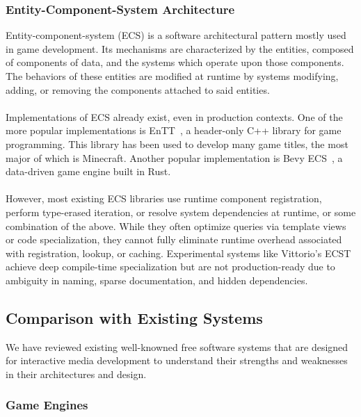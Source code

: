 \subsubsection*{Entity-Component-System Architecture}

Entity-component-system (ECS) is a software architectural pattern mostly used in game development.
Its mechanisms are characterized by the entities, composed of components of data,
and the systems which operate upon those components.
The behaviors of these entities are modified at runtime by systems modifying, adding, or removing the components
attached to said entities.
\\\\
Implementations of ECS already exist, even in production contexts.
One of the more popular implementations is EnTT~\cite{ValtoLibraries_EnTT}, a header-only C++ library for game programming.
This library has been used to develop many game titles, the most major of which is Minecraft.
Another popular implementation is Bevy ECS~\cite{Bevy_Engine}, a data-driven game engine built in Rust.
\\\\
However, most existing ECS libraries use runtime component registration, perform type-erased iteration, or resolve
system dependencies at runtime, or some combination of the above.
While they often optimize queries via template views or code specialization, they cannot fully eliminate
runtime overhead associated with registration, lookup, or caching.
Experimental systems like Vittorio's ECST~\cite{vittorio} achieve deep compile-time specialization
but are not production-ready due to ambiguity in naming, sparse documentation, and hidden dependencies.

\subsection{Comparison with Existing Systems}
\label{subsec:comparison-with-existing-systems}

We have reviewed existing well-knowned free software systems that are designed for interactive media 
development to understand their strengths and weaknesses in their architectures and design.

\subsubsection*{Game Engines}

